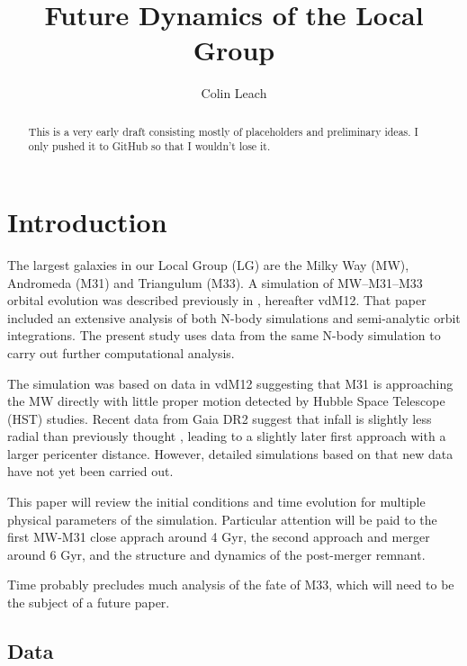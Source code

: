 \documentclass[twocolumn]{aastex63}
\begin{document}
	
\title{Future Dynamics of the Local Group}

\author[0000-0003-3608-1546]{Colin Leach}

\begin{abstract}
	
\color{red}This is a very early draft consisting mostly of placeholders and preliminary ideas. I only pushed it to GitHub so that I wouldn't lose it.\color{black}

\end{abstract}


\section{Introduction}

The largest galaxies in our Local Group (LG) are the Milky Way (MW), Andromeda (M31) and Triangulum (M33).  A simulation of MW--M31--M33 orbital evolution was described previously in \citet{marel_m31_2012}, hereafter vdM12. That paper included an extensive analysis of both N-body simulations and semi-analytic orbit integrations. The present study uses data from the same N-body simulation to carry out further computational analysis.

The simulation was based on data in vdM12 suggesting that M31 is approaching the MW directly with little proper motion detected by Hubble Space Telescope (HST) studies. Recent data from Gaia DR2 \citep{brown_gaia_2018} suggest that infall is slightly less radial than previously thought \citep{marel_first_2019}, leading to a slightly later first approach with a larger pericenter distance. However, detailed simulations based on that new data have not yet been carried out.

This paper will review the initial conditions and time evolution for multiple physical parameters of the simulation. Particular attention will be paid to the first MW-M31 close apprach around 4 Gyr, the second approach and merger around 6 Gyr, and the structure and dynamics of the post-merger remnant.

Time probably precludes much analysis of the fate of M33, which will need to be the subject of a future paper.

\subsection{Data}
\end{document}
